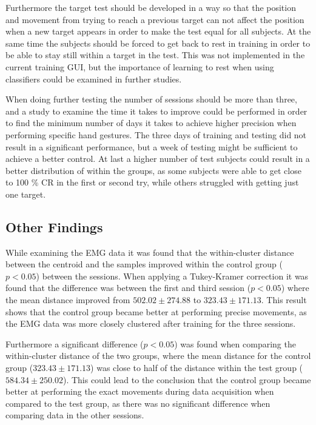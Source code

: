 Furthermore the target test should be developed in a way so that the position and movement from trying to reach a previous target can not affect the position when a new target appears in order to make the test equal for all subjects. At the same time the subjects should be forced to get back to rest in training in order to be able to stay still within a target in the test. This was not implemented in the current training GUI, but the importance of learning to rest when using classifiers could be examined in further studies.

When doing further testing the number of sessions should be more than three, and a study to examine the time it takes to improve could be performed in order to find the minimum number of days it takes to achieve higher precision when performing specific hand gestures. The three days of training and testing did not result in a significant performance, but a week of testing might be sufficient to achieve a better control. At last a higher number of test subjects could result in a better distribution of within the groups, as some subjects were able to get close to 100 \% CR in the first or second try, while others struggled with getting just one target. 

\subsection{Other Findings}
While examining the EMG data it was found that the within-cluster distance between the centroid and the samples improved within the control group ($p < 0.05$) between the sessions. When applying a Tukey-Kramer correction it was found that the difference was between the first and third session ($p < 0.05$) where the mean distance improved from $502.02 \pm 274.88$ to $323.43 \pm 171.13$. This result shows that the control group became better at performing precise movements, as the EMG data was more closely clustered after training for the three sessions. 

Furthermore a significant difference ($p < 0.05$) was found when comparing the within-cluster distance of the two groups, where the mean distance for the control group ($323.43 \pm 171.13$) was close to half of the distance within the test group ($584.34 \pm 250.02$). This could lead to the conclusion that the control group became better at performing the exact movements during data acquisition when compared to the test group, as there was no significant difference when comparing data in the other sessions. 

